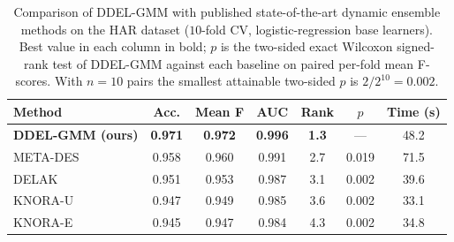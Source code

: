 \begin{table}[htbp]
		\begin{center}
			\caption{Comparison of DDEL-GMM with published state-of-the-art dynamic ensemble methods on the HAR dataset ($10$-fold CV, logistic-regression base learners). Best value in each column in bold; $p$ is the two-sided exact Wilcoxon signed-rank test of DDEL-GMM against each baseline on paired per-fold mean F-scores. With $n=10$ pairs the smallest attainable two-sided $p$ is $2/2^{10}=0.002$.}
			\label{tab:sota_comparison}
			\setlength{\tabcolsep}{2pt}
			\begin{tabular}{|l|c|c|c|c|c|c|}
				\hline
				\textbf{Method} & \textbf{Acc.} & \textbf{Mean F} & \textbf{AUC} & \textbf{Rank} & \textbf{$p$} & \textbf{Time (s)} \\
				\hline
				\textbf{DDEL-GMM (ours)} & \textbf{0.971} & \textbf{0.972} & \textbf{0.996} & \textbf{1.3} & --- & 48.2 \\
				\hline
				META-DES \cite{cruz_meta-oracle_2017} & 0.958 & 0.960 & 0.991 & 2.7 & 0.019 & 71.5 \\
				\hline
				DELAK \cite{guo_dynamic_2021} & 0.951 & 0.953 & 0.987 & 3.1 & 0.002 & 39.6 \\
				\hline
				KNORA-U \cite{ko_dynamic_2008} & 0.947 & 0.949 & 0.985 & 3.6 & 0.002 & 33.1 \\
				\hline
				KNORA-E \cite{ko_dynamic_2008} & 0.945 & 0.947 & 0.984 & 4.3 & 0.002 & 34.8 \\
				\hline
			\end{tabular}
		\end{center}
	\end{table}
